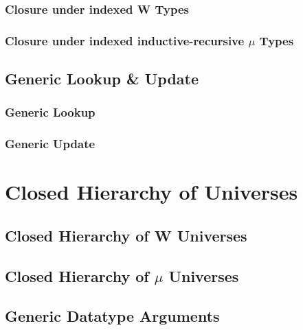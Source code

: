 \documentclass[12pt]{report}
\theoremstyle{definition}
\theoremstyle{remark}
\numberwithin{definition}{section}
\numberwithin{equation}{section}
\numberwithin{proposition}{section}
\numberwithin{conjecture}{section}
\numberwithin{theorem}{section}
\numberwithin{lemma}{section}
\numberwithin{corollary}{section}
\numberwithin{example}{section}
\numberwithin{remark}{section}
\begin{document}
\section{Closure under indexed W Types}
\section{Closure under indexed inductive-recursive $\mu$ Types}

\chapter{Generic Lookup \& Update}\label{ch:gupdate}
\section{Generic Lookup}
\section{Generic Update}



\part{Closed Hierarchy of Universes}\label{part:hier}

\chapter{Closed Hierarchy of W Universes}\label{ch:hier}
\chapter{Closed Hierarchy of $\mu$ Universes}\label{ch:hier}
\chapter{Generic Datatype Arguments}\label{ch:gargs}


\end{document}
